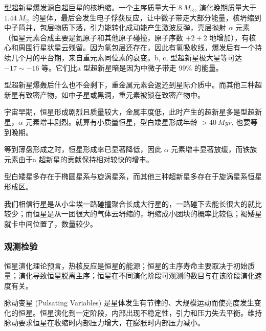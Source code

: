 \documentclass[../天体物理基础.tex]{subfiles}
\begin{document}
\uppercase\expandafter{}型超新星爆发源自超巨星的核坍缩。一个主序质量大于 $\qty{8}{M_{\odot}}$, 演化晚期质量大于 $\qty{1.44}{M_{\odot}}$ 的星体，最后会发生电子俘获反应，让中微子带走大部分能量，核坍缩到中子简并，包层物质下落，引力能转化成动能产生激波反弹，壳层抛射 $\alpha$ 元素（恒星元素合成主要是氦原子和其他原子碰撞，原子序数 $+2+2$ 地增加），有核心和周围行星状星云残留。因为氢包层还存在，因此有氢吸收线，爆发后有一个持续几个月的平台期，来自重元素同位素的衰变。\uppercase\expandafter{}b, \uppercase\expandafter{}c, \uppercase\expandafter{}型超新星极大星等可达 $-17\sim-16$ 等。它们比\uppercase\expandafter{}a 型超新星暗是因为中微子带走 99\% 的能量。

\uppercase\expandafter{}型超新星爆轰后什么也不会剩下，重金属元素会返还到星际介质中。而其他三种超新星有致密产物，如中子星或黑洞，重元素被锁在致密产物中。

宇宙早期，恒星形成剧烈且质量较大，金属丰度低，此时产生的超新星多是\uppercase\expandafter{}型超新星，$\alpha$ 元素增丰剧烈。就算有小质量恒星，\uppercase\expandafter{}型白矮星形成年龄 $>\qty{40}{Myr}$, 也要等到晚期。

等到薄盘形成之时，恒星形成率已显著降低，因此 $\alpha$ 元素增丰显著放缓，而铁族元素由于\uppercase\expandafter{}a 超新星的贡献保持相对较快的增丰。

\uppercase\expandafter{}型白矮星多存在于椭圆星系与旋涡星系，而其他三种超新星多存在于旋涡星系恒星形成区。

我们相信行星是从小尘埃一路碰撞聚合长成大行星的，一路碰下去能长很大的就比较少；而恒星是从一团很大的气体云坍缩的，坍缩成小团块的概率比较低；褐矮星就卡中间位置了，数量较少。

\subsubsection{观测检验}
恒星演化理论预言，热核反应是恒星的能源；恒星的主序寿命主要取决于初始质量；演化导致恒星脱离主序；恒星在不同演化阶段可观测的数目与在该阶段演化速度有关。

脉动变星 (Pulsating Variables) 是星体发生有节律的、大规模运动而使亮度发生变化的恒星。恒星演化到一定阶段，内部出现不稳定性，引力和压力失去平衡。维持脉动要求恒星在收缩时内部压力增大，在膨胀时内部压力减小。
\end{document}
